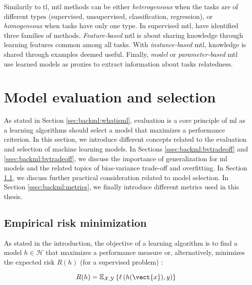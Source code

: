 Similarily to \acrlong{tl}, \acrlong{mtl} methods can be either \textit{heterogeneous}
when the tasks are of different types (\eg supervised, unsupervised, classification,
regression), or \textit{homogeneous} when tasks have only one type. In supervised
\acrlong{mtl}, \parencite{zhang2017survey} have identified three families of
methods. \textit{Feature-based} \acrlong{mtl} is about sharing knowledge through
learning features common among all tasks. With \textit{instance-based} \acrlong{mtl},
knowledge is shared through examples deemed useful. Finally, \textit{model} or
\textit{parameter-based} \acrlong{mtl} use learned models as proxies to extract
information about tasks relatedness.

\section{Model evaluation and selection}

As stated in Section \ref{sec:backml:whatisml}, evaluation is a core principle of
\acrlong{ml} as a learning algorithms should select a model that maximizes a
performance criterion. In this section, we introduce different concepts related
to the evaluation and selection of machine learning models. In Sections
\ref{ssec:backml:bvtradeoff} and \ref{ssec:backml:bvtradeoff}, we discuss the
importance of generalization for \acrlong{ml} models and the related topics of
bias-variance trade-off and overfitting. In Section \ref{ssec:backml:modelselection},
we discuss further practical consideration related to model selection. In Section
\ref{ssec:backml:metrics}, we finally introduce different metrics used in this
thesis.


\subsection{Empirical risk minimization}
\label{ssec:backml:modelselection}
As stated in the introduction, the objective of a learning algorithm is to find
a model $h \in \mathcal{H}$ that maximizes a performance measure or, alternatively,
minimizes the expected risk $R(h)$ (for a supervised problem) \parencite{vapnik1992principles}:

\begin{equation}
\label{eqn:backml:expriskmin}
R(h) = \mathbb{E}_{\mathcal{X},\mathcal{Y}}\left\{\ell\left(h(\vect{x}), y\right)\right\}
\end{equation}

